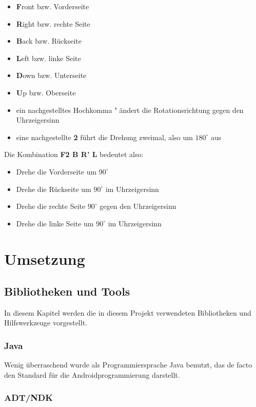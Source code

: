 \begin{itemize}
  \item \textbf{F}ront bzw. Vorderseite
  \item \textbf{R}ight bzw. rechte Seite
  \item \textbf{B}ack bzw. Rückseite
  \item \textbf{L}eft bzw. linke Seite
  \item \textbf{D}own bzw. Unterseite
  \item \textbf{U}p bzw. Oberseite
  \item ein nachgestelltes Hochkomma \textbf{'} ändert die Rotationsrichtung gegen den
    Uhrzeigersinn
  \item eine nachgestellte \textbf{2} führt die Drehung zweimal, also um
    $180^\circ$ aus
\end{itemize}

Die Kombination \textbf{F2 B R' L} bedeutet also:
\begin{itemize}
  \item Drehe die Vorderseite um $90^\circ$
  \item Drehe die Rückseite um $90^\circ$ im Uhrzeigersinn
  \item Drehe die rechte Seite $90^\circ$ gegen den Uhrzeigersinn
  \item Drehe die linke Seite um $90^\circ$ im Uhrzeigersinn
\end{itemize}


\section{Umsetzung}  %

\subsection{Bibliotheken und Tools}  %
In diesem Kapitel werden die in diesem Projekt verwendeten Bibliotheken und
Hilfswerkzeuge vorgestellt.

\subsubsection{Java}  %

Wenig überraschend wurde als Programmiersprache Java benutzt, das de facto den
Standard für die Androidprogrammierung darstellt.

\subsubsection{ADT/NDK}  %

